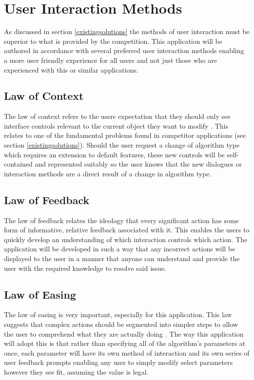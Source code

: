\section{User Interaction Methods}
\label{uiMethods}
As discussed in section \ref{existingsolutions} the methods of user interaction must be superior to what is provided by the competition. This application will be authored in accordance with several preferred user interaction methods enabling a more user friendly experience for all users and not just those who are experienced with this or similar applications.

\subsection{Law of Context}

The law of context refers to the users expectation that they should only see interface controls relevant to the current object they want to modify \cite{99designs:laws}. This relates to one of the fundamental problems found in competitor applications (see section \ref{existingsolutions}). Should the user request a change of algorithm type which requires an extension to default features, these new controls will be self-contained and represented suitably so the user knows that the new dialogues or interaction methods are a direct result of a change in algorithm type.

\subsection{Law of Feedback}

The law of feedback relates the ideology that every significant action has some form of informative, relative feedback associated with it\cite{99designs:laws}. This enables the users to quickly develop an understanding of which interaction controls which action. The application will be developed in such a way that any incorrect actions will be displayed to the user in a manner that anyone can understand and provide the user with the required knowledge to resolve said issue.

\subsection{Law of Easing}

The law of easing is very important, especially for this application. This law suggests that complex actions should be segmented into simpler steps to allow the user to comprehend what they are actually doing \cite{99designs:laws}. The way this application will adopt this is that rather than specifying all of the algorithm’s parameters at once, each parameter will have its own method of interaction and its own series of user feedback prompts enabling any user to simply modify select parameters however they see fit, assuming the value is legal.